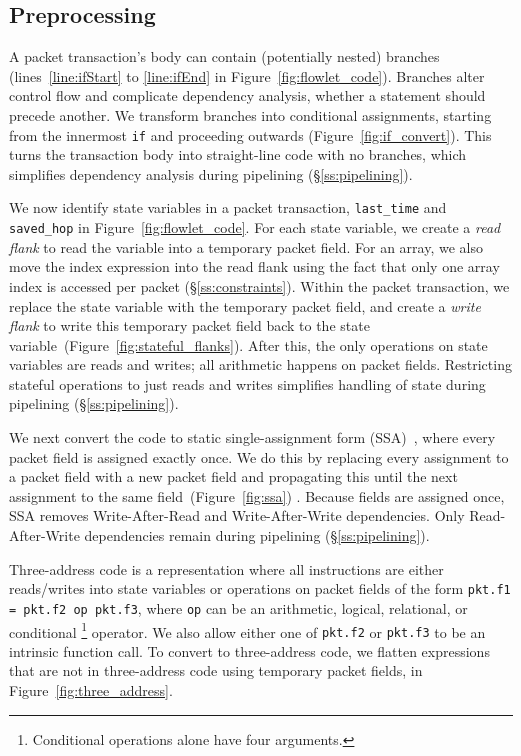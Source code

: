 \subsection{Preprocessing}
\label{ss:preprocessing}

 A packet transaction's body can contain (potentially
nested) branches (\eg lines~\ref{line:ifStart} to \ref{line:ifEnd} in
Figure~\ref{fig:flowlet_code}).  Branches alter control flow and complicate
dependency analysis, \ie whether a statement should precede another.  We
transform branches into conditional assignments, starting from the innermost
\texttt{if} and proceeding outwards (Figure~\ref{fig:if_convert}).  This turns
the transaction body into straight-line code with no branches, which simplifies
dependency analysis during pipelining (\S\ref{ss:pipelining}).

 We now identify state variables
in a packet transaction, \eg \texttt{last\_time} and \texttt{saved\_hop} in
Figure~\ref{fig:flowlet_code}.  For each state variable, we create a
\textit{read flank} to read the variable into a temporary packet field.  For an
array, we also move the index expression into the read flank using the fact
that only one array index is accessed per packet (\S\ref{ss:constraints}).
Within the packet transaction, we replace the state variable with the temporary
packet field, and create a \textit{write flank} to write this temporary packet
field back to the state variable~(Figure~\ref{fig:stateful_flanks}). After
this, the only operations on state variables are reads and writes; all
arithmetic happens on packet fields. Restricting stateful operations to just
reads and writes simplifies handling of state during pipelining
(\S\ref{ss:pipelining}).

 We next convert the code
to static single-assignment form (SSA)~\cite{ssa}, where every packet field is
assigned exactly once. We do this by replacing every assignment to a packet
field with a new packet field and propagating this until the next assignment to
the same field~(Figure~\ref{fig:ssa}) .  Because fields are assigned once, SSA
removes Write-After-Read and Write-After-Write dependencies.  Only
Read-After-Write dependencies remain during pipelining (\S\ref{ss:pipelining}).

 Three-address code is a
representation where all instructions are either reads/writes into state
variables or operations on packet fields of the form \texttt{pkt.f1 = pkt.f2 op
pkt.f3}, where \texttt{op} can be an arithmetic, logical, relational, or
conditional \footnote{Conditional operations alone have four arguments.}
operator. We also allow either one of {\tt pkt.f2} or {\tt pkt.f3} to be an
intrinsic function call.  To convert to three-address code, we flatten
expressions that are not in three-address code using temporary packet fields,
 in Figure~\ref{fig:three_address}.

